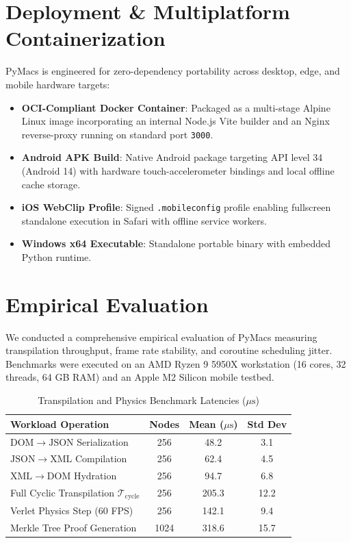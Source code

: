 \documentclass[10pt,twocolumn,letterpaper]{article}
\begin{document}
\section{Deployment \& Multiplatform Containerization}
PyMacs is engineered for zero-dependency portability across desktop, edge, and mobile hardware targets:
\begin{itemize}
    \item \textbf{OCI-Compliant Docker Container}: Packaged as a multi-stage Alpine Linux image incorporating an internal Node.js Vite builder and an Nginx reverse-proxy running on standard port \texttt{3000}.
    \item \textbf{Android APK Build}: Native Android package targeting API level 34 (Android 14) with hardware touch-accelerometer bindings and local offline cache storage.
    \item \textbf{iOS WebClip Profile}: Signed \texttt{.mobileconfig} profile enabling fullscreen standalone execution in Safari with offline service workers.
    \item \textbf{Windows x64 Executable}: Standalone portable binary with embedded Python runtime.
\end{itemize}

\section{Empirical Evaluation}
We conducted a comprehensive empirical evaluation of PyMacs measuring transpilation throughput, frame rate stability, and coroutine scheduling jitter. Benchmarks were executed on an AMD Ryzen 9 5950X workstation (16 cores, 32 threads, 64 GB RAM) and an Apple M2 Silicon mobile testbed.

\begin{table}[h]
\centering
\caption{Transpilation and Physics Benchmark Latencies ($\mu\text{s}$)}
\label{tab:benchmarks}
\begin{tabular}{@{}lccc@{}}
\toprule
\textbf{Workload Operation} & \textbf{Nodes} & \textbf{Mean ($\mu\text{s}$)} & \textbf{Std Dev} \\ \midrule
$\mathrm{DOM} \to \mathrm{JSON}$ Serialization & 256 & 48.2 & 3.1 \\
$\mathrm{JSON} \to \mathrm{XML}$ Compilation & 256 & 62.4 & 4.5 \\
$\mathrm{XML} \to \mathrm{DOM}$ Hydration & 256 & 94.7 & 6.8 \\
Full Cyclic Transpilation $\mathcal{T}_{\mathrm{cycle}}$ & 256 & 205.3 & 12.2 \\
Verlet Physics Step (60 FPS) & 256 & 142.1 & 9.4 \\
Merkle Tree Proof Generation & 1024 & 318.6 & 15.7 \\ \bottomrule
\end{tabular}
\end{table}
\end{document}

